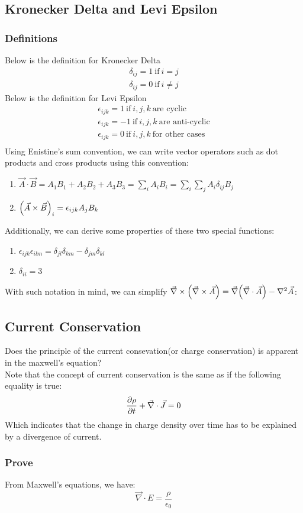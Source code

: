 \documentclass{article}
\begin{document}
\subsection*{Kronecker Delta and Levi Epsilon}
\subsubsection*{Definitions}
Below is the definition for Kronecker Delta 
\begin{align*}
  \delta_{ij} = 1 \ \text{if} \ i = j \\
  \delta_{ij} = 0 \ \text{if} \ i \neq j
\end{align*}
Below is the definition for Levi Epsilon
\begin{align*}
  \epsilon_{ijk} = 1 \ \text{if} \ i,j,k \ \text{are cyclic} \\
  \epsilon_{ijk} = -1 \ \text{if} \ i,j,k \ \text{are anti-cyclic} \\ 
  \epsilon_{ijk} = 0 \ \text{if} \ i,j,k \ \text{for other cases} \\ 
\end{align*}
Using Enistine's sum convention, we can write vector operators such as dot products and cross products using this convention:
\begin{enumerate}
  \item $\vec{A} \cdot \vec{B}  = A_1 B_1 + A_2 B_2 + A_3 B_3 = \sum_{i} A_i B_i = \sum_{i} \sum_{j}A_i \delta_{i j} B_j$
  \item $\qty(\vec{A} \times  \vec{B} )_i=\epsilon_{ijk} A_j B_k $
\end{enumerate}
Additionally, we can derive some properties of these two special functions:
\begin{enumerate}
  \item $\epsilon_{ijk} \epsilon_{ilm} = \delta_{jl} \delta_{km} - \delta_{jm}\delta_{kl}$
  \item $\delta_{ii} = 3$
\end{enumerate}
With such notation in mind, we can simplify $\vec{\nabla} \times \qty(\vec{\nabla} \times \vec{A}  ) = \vec{\nabla}\qty(\vec{\nabla} \cdot \vec{A} ) - \laplacian \vec{A}$:







\subsection*{Current Conservation}
Does the principle of the current consevation(or charge conservation) is apparent in the maxwell's equation? \\ 
Note that the concept of current conservation is the same as if the following equality is true:
\begin{equation*}
  \pdv{\rho}{t} + \vec{\nabla} \cdot  \vec{J} = 0  
\end{equation*}
Which indicates that the change in charge density over time has to be explained by a divergence of current. 
\subsubsection*{Prove}
From Maxwell's equations, we have:
\begin{equation*}
  \vec{\nabla} \cdot  E = \frac{\rho}{\epsilon_0}
\end{equation*}
\end{document}
